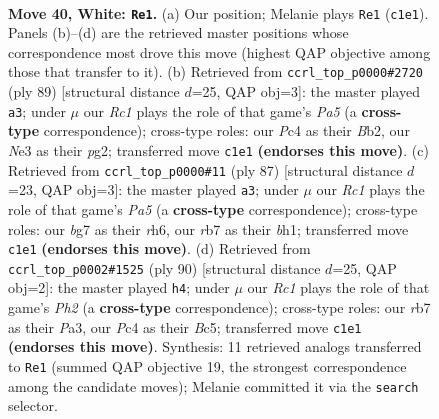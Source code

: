 \documentclass[11pt]{article}
\begin{document}
\clearpage

\begin{figure}[p]\centering
\begin{subfigure}{0.46\textwidth}\centering
\resizebox{\linewidth}{!}{%
\newchessgame
\chessboard[
  setfen={7k/1r4b1/R7/8/2P5/4N3/7K/2R5 w - - 0 40},
  showmover=false,
  pgfstyle=straightmove, color=movearrow, markmove={c1-e1}
]}
\caption{}
\end{subfigure}\hfill
\begin{subfigure}{0.46\textwidth}\centering
\resizebox{\linewidth}{!}{%
\newchessgame
\chessboard[
  setfen={8/6k1/2r5/7R/p7/3B4/1b2K1P1/8 b - - 3 45},
  showmover=false,
  pgfstyle=straightmove, color=movearrow, markmove={a4-a3}
]}
\caption{}
\end{subfigure}
\\[4pt]
\begin{subfigure}{0.46\textwidth}\centering
\resizebox{\linewidth}{!}{%
\newchessgame
\chessboard[
  setfen={8/8/1k4KR/r7/p7/8/8/7B b - - 3 44},
  showmover=false,
  pgfstyle=straightmove, color=movearrow, markmove={a4-a3}
]}
\caption{}
\end{subfigure}\hfill
\begin{subfigure}{0.46\textwidth}\centering
\resizebox{\linewidth}{!}{%
\newchessgame
\chessboard[
  setfen={8/8/p3b3/2B2k2/8/P4K2/7P/8 w - - 1 46},
  showmover=false,
  pgfstyle=straightmove, color=movearrow, markmove={h2-h4}
]}
\caption{}
\end{subfigure}
\caption{\textbf{Move 40, White: \texttt{Re1}.} (a) Our position; Melanie plays \texttt{Re1} (\texttt{c1e1}). Panels (b)--(d) are the retrieved master positions whose correspondence most drove this move (highest QAP objective among those that transfer to it). (b) Retrieved from \texttt{ccrl\_top\_p0000\#2720} (ply 89) [structural distance $d$=25, QAP obj=3]: the master played \texttt{a3}; under $\mu$ our \emph{Rc1} plays the role of that game's \emph{Pa5} (a \textbf{cross-type} correspondence); cross-type roles: our \emph{P}c4 as their \emph{B}b2, our \emph{N}e3 as their \emph{p}g2; transferred move \texttt{c1e1} \textbf{(endorses this move)}. (c) Retrieved from \texttt{ccrl\_top\_p0000\#11} (ply 87) [structural distance $d$=23, QAP obj=3]: the master played \texttt{a3}; under $\mu$ our \emph{Rc1} plays the role of that game's \emph{Pa5} (a \textbf{cross-type} correspondence); cross-type roles: our \emph{b}g7 as their \emph{r}h6, our \emph{r}b7 as their \emph{b}h1; transferred move \texttt{c1e1} \textbf{(endorses this move)}. (d) Retrieved from \texttt{ccrl\_top\_p0002\#1525} (ply 90) [structural distance $d$=25, QAP obj=2]: the master played \texttt{h4}; under $\mu$ our \emph{Rc1} plays the role of that game's \emph{Ph2} (a \textbf{cross-type} correspondence); cross-type roles: our \emph{r}b7 as their \emph{P}a3, our \emph{P}c4 as their \emph{B}c5; transferred move \texttt{c1e1} \textbf{(endorses this move)}. Synthesis: 11 retrieved analogs transferred to \texttt{Re1} (summed QAP objective 19, the strongest correspondence among the candidate moves); Melanie committed it via the \texttt{search} selector.}
\label{fig:thought-m78}
\end{figure}
\end{document}
